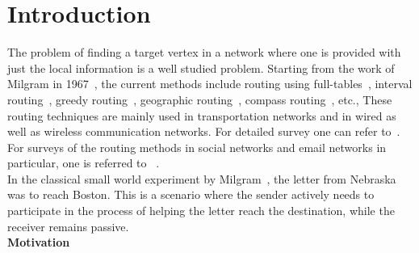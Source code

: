 \documentclass[10pt, conference, compsocconf]{IEEEtran}
\begin{document}
%
\IEEEpeerreviewmaketitle



\section{Introduction}
The problem of finding a target vertex in a network where one is provided with just the local information is a well studied problem. Starting from the work of Milgram in 1967~\cite{milgram67}, the current methods include routing using full-tables~\cite{gavoille01}, interval routing~\cite{gavoille99,gavoille01}, 
greedy routing~\cite{giordano01,kleinberg-1-00}, geographic routing~\cite{giordano01}, compass routing~\cite{giordano01}, etc., These routing techniques are mainly used in transportation networks and in wired as well as wireless communication networks. For detailed survey one can refer to~\cite{gavoille99, gavoille01, giordano01}. %
   For surveys of the routing methods in social networks and email networks in particular, one is referred to%
~\cite{adamic02, adamic01, kleinberg-1-00}.\\
%
 
In the classical small world experiment by Milgram~\cite{milgram67}, the letter from Nebraska was to reach Boston. This is a scenario where the sender actively needs to participate in the process of helping the letter reach the destination, while the receiver remains passive. 
\\
{\bf Motivation}
\end{document}
